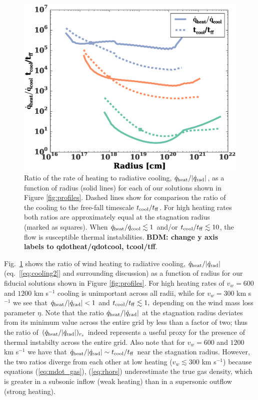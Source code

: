 \documentclass[usenatbib,fleqn]{mn2e}
\newcommand{\tcool}{t_{\rm cool}}
\newcommand{\tff}{t_{\rm ff}}
\begin{document}
\begin{figure}
  \includegraphics[width=\columnwidth]{cooling.eps}
  \caption{\label{fig:cooling} Ratio of the rate of heating to radiative cooling, $\dot{q}_{\rm heat}/|\dot{q}_{\rm rad}|$, as a function of radius (solid lines) for each of our solutions shown in Figure \ref{fig:profiles}.  Dashed lines show for comparison the ratio of the cooling to the free-fall timescale $t_{\rm cool}/t_{\rm ff}$.  For high heating rates both ratios are approximately equal at the stagnation radius (marked as squares).  When $\dot{q}_{\rm heat}/\dot{q}_{\rm cool} \lesssim 1$ and/or $t_{\rm cool}/t_{\rm ff} \lesssim 10$, the flow is susceptible thermal instabilities.  {\bf BDM: change y axis labels to qdotheat/qdotcool, tcool/tff}.}
\end{figure}


Fig.~\ref{fig:cooling} shows the ratio of wind heating to radiative cooling, $\dot{q}_{\rm heat}/|\dot{q}_{\rm rad}|$ (eq.~[\ref{eq:cooling2}] and surrounding discussion) as a function of radius for our fiducial solutions shown in Figure \ref{fig:profiles}.  For high heating rates of $v_{w} = 600$ and $1200$ km s$^{-1}$ cooling is unimportant across all radii, while for $v_{w} = 300$ km s$^{-1}$ we see that $\dot{q}_{\rm heat}/|\dot{q}_{\rm rad}| < 1$ and $\tcool/\tff \lesssim 1,$ depending on the wind mass loss parameter $\eta$.  Note that the ratio $\dot{q}_{\rm heat}/|\dot{q}_{\rm rad}|$ at the stagnation radius deviates from its minimum value across the entire grid by less than a factor of two; thus the ratio of $(\dot{q}_{\rm heat}/|\dot{q}_{\rm rad}|)_{r_{s}}$ indeed represents a useful proxy for the presence of thermal instabilty across the entire grid.  Also note that for $v_{w}=600$ and $1200$ km s$^{-1}$ we have that $\dot{q}_{\rm heat}/|\dot{q}_{\rm rad}| \sim t_{\rm cool}/t_{\rm ff}$ near the stagnation radius.  However, the two ratios diverge from each other at low heating ($v_{w} \lesssim 300$ km s$^{-1}$) because equations (\ref{eq:mdot_gas}), (\ref{eq:rhors}) underestimate the true gas density, which is greater in a subsonic inflow (weak heating) than in a supersonic outflow (strong heating).  
\end{document}
